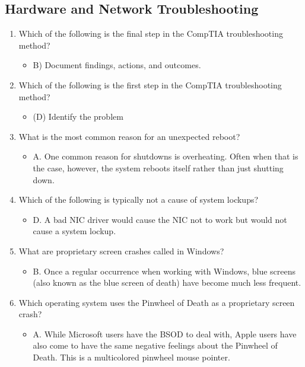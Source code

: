 \documentclass{article}
\begin{document}
\subsection{Hardware and Network Troubleshooting}
\begin{enumerate}
    \item Which of the following is the final step in the CompTIA troubleshooting method?
    \begin{itemize}
        \item B) Document findings, actions, and outcomes.
    \end{itemize}
    \item Which of the following is the first step in the CompTIA troubleshooting method?
    \begin{itemize}
        \item (D) Identify the problem 
    \end{itemize}
    \item What is the most common reason for an unexpected reboot?
    \begin{itemize}
        \item A. One common reason for shutdowns is overheating. Often when that is the case,
however, the system reboots itself rather than just shutting down.
    \end{itemize}
    \item Which of the following is typically not a cause of system lockups?
    \begin{itemize}
        \item D. A bad NIC driver would cause the NIC not to work but would not cause a system
lockup.
    \end{itemize}
    \item What are proprietary screen crashes called in Windows?
    \begin{itemize}
        \item B. Once a regular occurrence when working with Windows, blue screens (also known as
the blue screen of death) have become much less frequent.
    \end{itemize}
    \item Which operating system uses the Pinwheel of Death as a proprietary screen crash?
    \begin{itemize}
        \item A. While Microsoft users have the BSOD to deal with, Apple users have also come to have
the same negative feelings about the Pinwheel of Death. This is a multicolored pinwheel
mouse pointer.

\end{itemize}
\end{enumerate}
\end{document}
